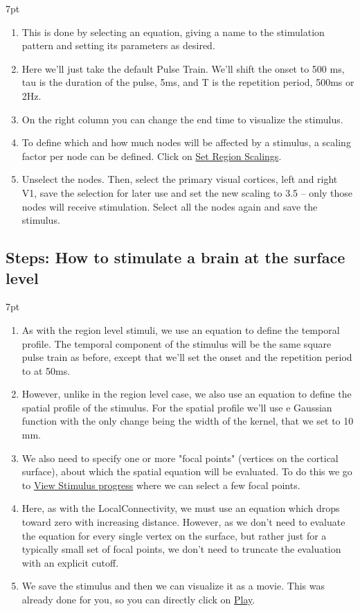 \documentclass{tufte-handout}
\newenvironment{formal}{%
  \def\FrameCommand{%
    \hspace{1pt}%
    {\color{DarkBlue}\vrule width 2pt}%
    {\color{formalshade}\vrule width 4pt}%
    \colorbox{formalshade}%
  }%
  \MakeFramed{\advance\hsize-\width\FrameRestore}%
  \noindent\hspace{-4.55pt}%
  \begin{adjustwidth}{}{7pt}%
  \vspace{2pt}\vspace{2pt}%
}
{%
  \vspace{2pt}\end{adjustwidth}\endMakeFramed%
}
\begin{document}
\begin{formal}
\begin{enumerate}
\item This is done by selecting an equation, giving a name to the stimulation pattern and setting its parameters as desired.
\item Here we'll just take the default Pulse Train. We'll shift the onset to 500 ms, tau is the duration of the pulse, 5ms, and T is the repetition period, 500ms or 2Hz.  
\item On the right column you can change the end time to visualize the stimulus. 
\item To define which and how much nodes will be affected by a stimulus, a scaling factor per node can be defined. Click on \underline{Set Region Scalings}. 
\item Unselect the nodes. Then, select the primary visual cortices, left and right V1, save the selection for later use and set the new scaling to 3.5 -- only those nodes will receive stimulation. Select all the nodes again and save the stimulus.
\end{enumerate}
\end{formal}


\subsection{Steps: How to stimulate a brain at the surface level}\label{sec:steps}


\begin{formal}
\begin{enumerate}
\item As with the region level stimuli, we use an equation to define the temporal
profile. The temporal component of the stimulus will be the same square pulse train as before, except that we'll set the onset and the repetition period to at 50ms.
\item  However, unlike in the region level case, we also use an equation to
define the spatial profile of the stimulus. For the spatial profile we'll use e Gaussian function with the only change being the width of the kernel, that we set to 10 mm.

\item We also need to specify one or
more "focal points" (vertices on the cortical surface), about which the
spatial equation will be evaluated. To do this we go to \underline{View Stimulus progress} where we can select a few focal points. 
\item Here, as with the LocalConnectivity, we
must use an equation which drops toward zero with increasing distance.
However, as we don't need to evaluate the equation for every single vertex on
the surface, but rather just for a typically small set of focal points, we
don't need to truncate the evaluation with an explicit cutoff.
\item We save the stimulus and then we can visualize it as a movie. This was already done for you, so you can directly click on \underline{Play}. 
\end{enumerate}
\end{formal}
 
\end{document}
